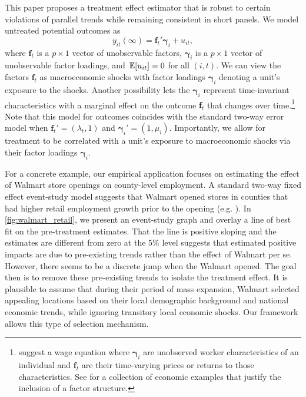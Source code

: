 \documentclass[12pt]{article}
\begin{document}
This paper proposes a treatment effect estimator that is robust to certain violations of parallel trends while remaining consistent in short panels. We model untreated potential outcomes as
\begin{equation}\label{eq:untreated_po}
y_{it}(\infty) = \bm{f}_t' \bm{\gamma}_i + u_{it},
\end{equation}
where $\bm f_t$ is a $p \times 1$ vector of unobservable factors, $\bm \gamma_i$ is a $p \times 1$ vector of unobservable factor loadings, and $\expec{u_{it}} = 0$ for all $(i,t)$. We can view the factors $\bm f_t$ as macroeconomic shocks with factor loadings $\bm \gamma_i$ denoting a unit's exposure to the shocks. Another possibility lets the $\bm \gamma_i$ represent time-invariant characteristics with a marginal effect on the outcome $\bm f_t$ that changes over time.\footnote{\citet{Ahn_Lee_Schmidt_2013} suggest a wage equation where $\bm \gamma_i$ are unobserved worker characteristics of an individual and $\bm f_t$ are their time-varying prices or returns to those characteristics. See \citet{Bai_2009} for a collection of economic examples that justify the inclusion of a factor structure.} Note that this model for outcomes coincides with the standard two-way error model when $\bm f_t' = (\lambda_t, 1)$ and $\bm \gamma_i' = (1, \mu_i)$. Importantly, we allow for treatment to be correlated with a unit's exposure to macroeconomic shocks via their factor loadings $\bm{\gamma}_i$. 

For a concrete example, our empirical application focuses on estimating the effect of Walmart store openings on county-level employment. A standard two-way fixed effect event-study model suggests that Walmart opened stores in counties that had higher retail employment growth prior to the opening (e.g. \citet{neumark2008effects}). In \autoref{fig:walmart_retail}, we present an event-study graph and overlay a line of best fit on the pre-treatment estimates. That the line is positive sloping and the estimates are different from zero at the 5\% level suggests that estimated positive impacts are due to pre-existing trends rather than the effect of Walmart per se. However, there seems to be a discrete jump when the Walmart opened. The goal then is to remove these pre-existing trends to isolate the treatment effect. It is plausible to assume that during their period of mass expansion, Walmart selected appealing locations based on their local demographic background and national economic trends, while ignoring transitory local economic shocks. Our framework allows this type of selection mechanism.
\end{document}
